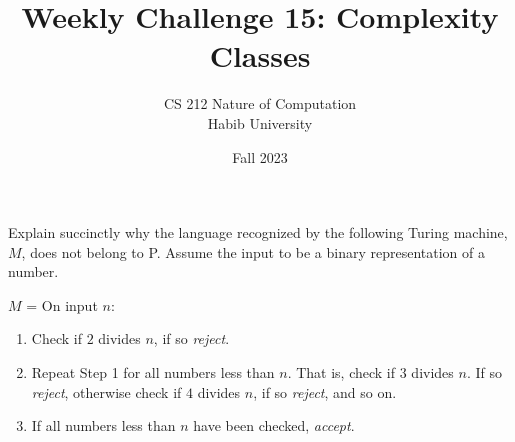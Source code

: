 \documentclass[a4paper]{exam}
\title{Weekly Challenge 15: Complexity Classes}
\author{CS 212 Nature of Computation\\Habib University}
\date{Fall 2023}
\theoremstyle{theorem}
\theoremstyle{claim}
\begin{document}
\maketitle

\begin{questions}


  Explain succinctly why the language recognized by the following Turing machine, $M$, does not belong to P. Assume the input to be a binary representation of a number.
  
  $M$ = On input $n$:
  \begin{enumerate}
  \item Check if $2$ divides $n$, if so \textit{reject}.
  \item Repeat Step 1 for all numbers less than $n$. That is, check if $3$ divides $n$. If so \textit{reject}, otherwise check if $4$ divides $n$, if so \textit{reject}, and so on.
  \item If all numbers less than $n$ have been checked, \textit{accept}.
  \end{enumerate}
\end{questions}
\end{document}
